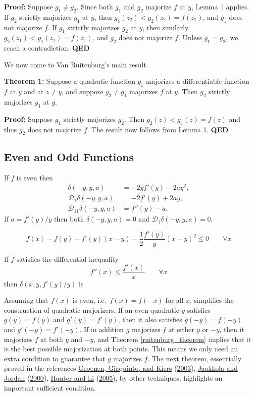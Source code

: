 \documentclass[
  12pt,
]{book}
\begin{document}
\textbf{Proof:}
Suppose \(g_1\not= g_2\). Since both \(g_1\) and \(g_2\) majorize \(f\) at \(y\), Lemma
1 applies. If \(g_2\) strictly majorizes \(g_1\) at \(y\), then \(g_1(z_2)<g_2(z_2)= f(z_2)\), and \(g_1\) does not majorize \(f\). If \(g_1\) strictly majorizes \(g_2\) at \(y\), then similarly \(g_2(z_1)< g_1(z_1) = f(z_1)\),
and \(g_2\) does not majorize \(f\). Unless \(g_1=g_2\), we reach a contradiction.
\textbf{QED}

We now come to Van Ruitenburg's main result.

\textbf{Theorem 1:}
Suppose a quadratic function \(g_1\) majorizes a differentiable function \(f\) at \(y\) and
at \(z\not= y\), and suppose \(g_2\not= g_1\) majorizes \(f\) at \(y\). Then \(g_2\) strictly majorizes \(g_1\) at \(y\).

\textbf{Proof:}
Suppose \(g_1\) strictly majorizes \(g_2\). Then \(g_2(z)<g_1(z)=f(z)\) and thus \(g_2\) does not majorize \(f\). The result now follows from Lemma 1.
\textbf{QED}

\hypertarget{even-and-odd-functions}{%
\subsection{Even and Odd Functions}\label{even-and-odd-functions}}

If \(f\) is even then
\begin{align*}
\delta(-y,y,a)&=+2yf'(y)-2ay^2,\\
\mathcal{D}_1\delta(-y,y,a)&=-2f'(y)+2ay,\\
\mathcal{D}_{11}\delta(-y,y,a)&=f''(y)-a.
\end{align*}
If \(a=f'(y)/y\) then both \(\delta(-y,y,a)=0\) and \(\mathcal{D}_1\delta(-y,y,a)=0\).

\[
f(x)-f(y)-f'(y)(x-y)-\frac12\frac{f'(y)}{y}(x-y)^2\leq 0\qquad\forall x
\]

If \(f\) satisfies the differential inequality
\[
f''(x)\leq\frac{f'(x)}{x}\qquad\forall x
\]
then \(\delta(x,y,f'(y)/y)\) is

Assuming that \(f(x)\) is even, i.e.~\(f(x)=f(-x)\) for all \(x\), simplifies the construction of quadratic majorizers. If an even quadratic \(g\)
satisfies \(g(y)=f(y)\) and \(g'(y)=f'(y)\), then it also satisfies \(g(-y)=f(-y)\)
and \(g'(-y)=f'(-y)\). If in addition \(g\) majorizes \(f\) at either \(y\) or \(-y\), then it majorizes \(f\) at both \(y\) and \(-y\), and Theorem \ref{ruitenburg_theorem} implies that it is the best possible majorization at both points. This means we only need an extra condition to guarantee
that \(g\) majorizes \(f\). The next theorem, essentially proved in the references \protect\hyperlink{ref-groenen_giaquinto_kiers_03}{Groenen, Giaquinto, and Kiers} (\protect\hyperlink{ref-groenen_giaquinto_kiers_03}{2003}), \protect\hyperlink{ref-jaakkola_jordan_00}{Jaakkola and Jordan} (\protect\hyperlink{ref-jaakkola_jordan_00}{2000}), \protect\hyperlink{ref-hunter_li_05}{Hunter and Li} (\protect\hyperlink{ref-hunter_li_05}{2005}), by other techniques, highlights an important sufficient condition.
\end{document}
